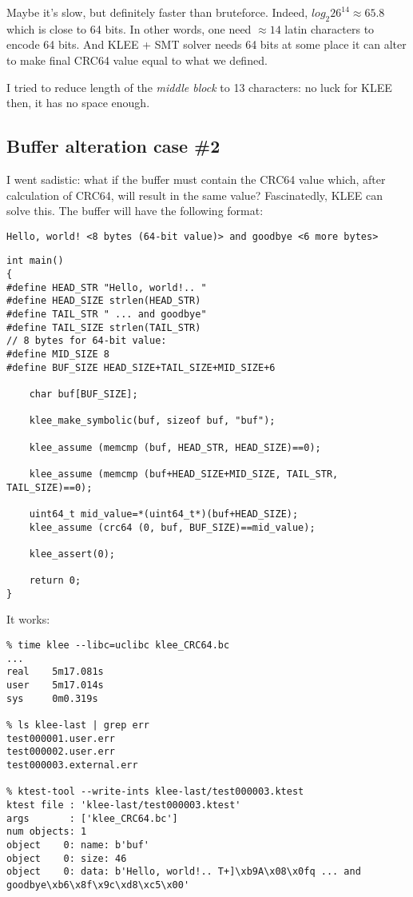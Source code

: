 Maybe it's slow, but definitely faster than bruteforce.
Indeed, $log_2{26^{14}} \approx 65.8$
which is close to 64 bits.
In other words, one need $\approx 14$ latin characters to encode 64 bits.
And KLEE + \ac{SMT} solver needs 64 bits at some place it can alter to make final CRC64 value equal to what we defined.

I tried to reduce length of the \textit{middle block} to 13 characters: no luck for KLEE then, it has no space enough.

\subsection{Buffer alteration case \#2}

I went sadistic: what if the buffer must contain the CRC64 value which, after calculation of CRC64, will result in the same value?
Fascinatedly, KLEE can solve this.
The buffer will have the following format:

\begin{lstlisting}
Hello, world! <8 bytes (64-bit value)> and goodbye <6 more bytes>
\end{lstlisting}

\begin{lstlisting}
int main()
{
#define HEAD_STR "Hello, world!.. "
#define HEAD_SIZE strlen(HEAD_STR)
#define TAIL_STR " ... and goodbye"
#define TAIL_SIZE strlen(TAIL_STR)
// 8 bytes for 64-bit value:
#define MID_SIZE 8
#define BUF_SIZE HEAD_SIZE+TAIL_SIZE+MID_SIZE+6

	char buf[BUF_SIZE];
  
	klee_make_symbolic(buf, sizeof buf, "buf");

	klee_assume (memcmp (buf, HEAD_STR, HEAD_SIZE)==0);

	klee_assume (memcmp (buf+HEAD_SIZE+MID_SIZE, TAIL_STR, TAIL_SIZE)==0);
	
	uint64_t mid_value=*(uint64_t*)(buf+HEAD_SIZE);
	klee_assume (crc64 (0, buf, BUF_SIZE)==mid_value);

	klee_assert(0);

	return 0;
}
\end{lstlisting}

It works:

\begin{lstlisting}
% time klee --libc=uclibc klee_CRC64.bc
...
real    5m17.081s
user    5m17.014s
sys     0m0.319s

% ls klee-last | grep err
test000001.user.err
test000002.user.err
test000003.external.err

% ktest-tool --write-ints klee-last/test000003.ktest
ktest file : 'klee-last/test000003.ktest'
args       : ['klee_CRC64.bc']
num objects: 1
object    0: name: b'buf'
object    0: size: 46
object    0: data: b'Hello, world!.. T+]\xb9A\x08\x0fq ... and goodbye\xb6\x8f\x9c\xd8\xc5\x00'
\end{lstlisting}

